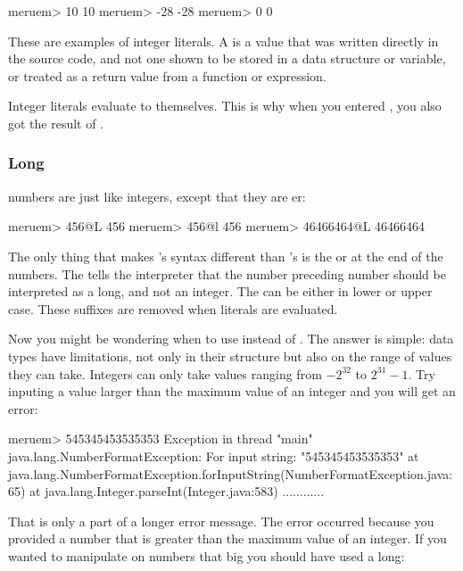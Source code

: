 \begin{REPL}
meruem> 10
10
meruem> -28
-28
meruem> 0
0
\end{REPL}

These are examples of integer literals. A  is a value that was written directly in the source code, and not one shown to be stored in a data structure or variable, or treated as a return value from a function or expression. 

Integer literals evaluate to themselves. This is why when you entered , you also got the result of . 

\subsubsection{Long}
 numbers are just like integers, except that they are er:

\begin{REPL}
meruem> 456@L
456
meruem> 456@l
456
meruem> 46466464@L
46466464
\end{REPL}

The only thing that makes 's syntax different than 's is the  or  at the end of the numbers. The  tells the interpreter that the number preceding number should be interpreted as a long, and not an integer. The  can be either in lower or upper case. These suffixes are removed when  literals are evaluated. 

Now you might be wondering when to use  instead of . The answer is simple: data types have limitations, not only in their structure but also on the range of values they can take. Integers can only take values ranging from $-2^{32}$ to $2^{31}-1$. Try inputing a value larger than the maximum value of an integer and you will get an error:

\begin{REPL}
meruem> 545345453535353
Exception in thread "main" java.lang.NumberFormatException: For input string: "545345453535353"
	at java.lang.NumberFormatException.forInputString(NumberFormatException.java:65)
	at java.lang.Integer.parseInt(Integer.java:583)
	............
\end{REPL}

That is only a part of a longer error message. The error occurred because you provided a number that is greater than the maximum value of an integer. If you wanted to manipulate on numbers that big you should have used a long:

